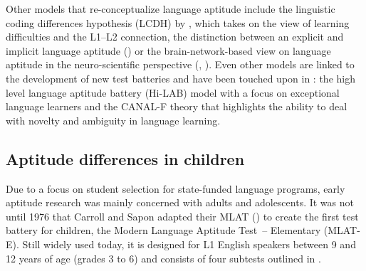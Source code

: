 \documentclass[output=paper]{langscibook}
\begin{document}
Other models that re-conceptualize language aptitude include the linguistic coding differences hypothesis (LCDH) by \citet{SparksGanschow1991}, which takes on the view of learning difficulties and the L1--L2 connection, the distinction between an explicit and implicit language aptitude (\citealt{Granena2012,Granena2016}) or the brain-network-based view on language aptitude in the neuro-scientific perspective (\citealt{GolestaniEtAl2011}, \citealt{ReitererEtAl2013}). Even other models are linked to the development of new test batteries and have been touched upon in : the high level language aptitude battery (Hi-LAB) model with a focus on exceptional language learners and the CANAL-F theory that highlights the ability to deal with novelty and ambiguity in language learning. 

\subsection{Aptitude differences in children}\label{sec:01:2.2} %
\largerpage
Due to a focus on student selection for state-funded language programs, early aptitude research was mainly concerned with adults and adolescents. It was not until 1976 that Carroll and Sapon adapted their MLAT (\citealt{CarrollSapon1959}) to create the first test battery for children, the Modern Language Aptitude Test~– Elementary (MLAT-E). Still widely used today, it is designed for L1 English speakers between 9 and 12 years of age (grades 3 to 6) and consists of four subtests outlined in .
\end{document}
